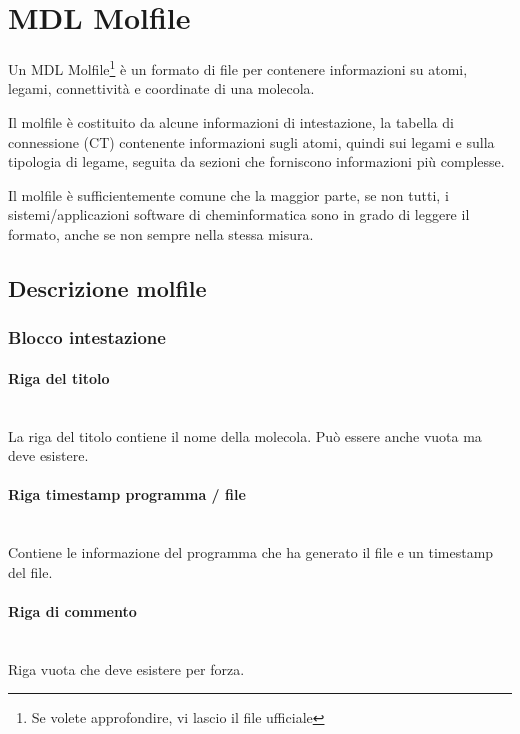 
\section{MDL Molfile}
Un MDL Molfile\footnote{Se volete approfondire, vi lascio il file ufficiale} è un formato di file per contenere informazioni su atomi, legami, connettività e coordinate di una molecola.

Il molfile è costituito da alcune informazioni di intestazione, la tabella di connessione (CT) contenente informazioni sugli atomi, quindi sui legami e sulla tipologia di legame, seguita da sezioni che forniscono informazioni più complesse.

Il molfile è sufficientemente comune che la maggior parte, se non tutti, i sistemi/applicazioni software di cheminformatica sono in grado di leggere il formato, anche se non sempre nella stessa misura.



\subsection{Descrizione molfile}
\subsubsection{Blocco intestazione}
\paragraph{Riga del titolo}\mbox{}\\
La riga del titolo contiene il nome della molecola. Può essere anche vuota ma deve esistere.


\paragraph{Riga timestamp programma / file}\mbox{}\\
Contiene le informazione del programma che ha generato il file e un timestamp del file.


\paragraph{Riga di commento}\mbox{}\\
Riga vuota che deve esistere per forza.


